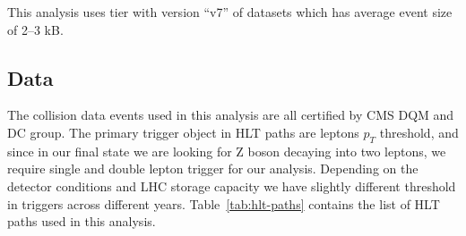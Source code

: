 This analysis uses \NanoAOD{} tier with version ``v7'' of datasets
which has average event size of 2--3 kB.

\subsection{
  Data
}

The collision data events used in this analysis are all certified
by \gls{CMS} \gls{DQM} and \gls{DC} group. The primary trigger object in
\gls{HLT} paths are leptons \( p_{T} \) threshold, and since in our final state
we are looking for Z boson decaying into two leptons, we require single and
double lepton trigger for our analysis. Depending on the detector
conditions and \gls{LHC} storage capacity we have slightly different threshold
in triggers across different years. Table~\ref{tab:hlt-paths} contains the list of
\gls{HLT} paths used in this analysis.

